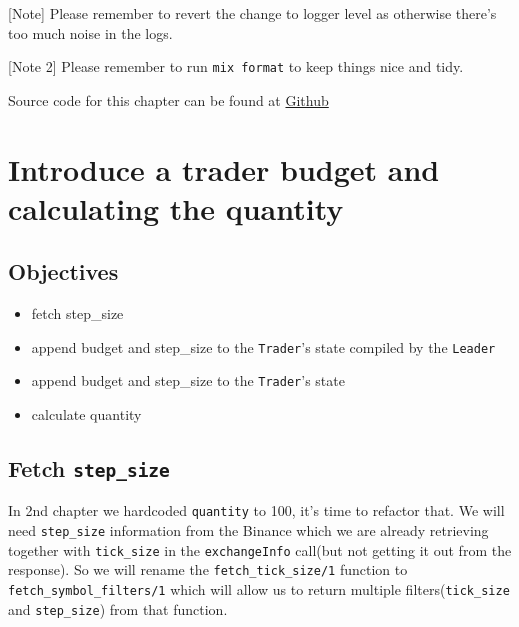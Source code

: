 \documentclass[
  oneside]{book}
\providecommand{\tightlist}{%
  \setlength{\itemsep}{0pt}\setlength{\parskip}{0pt}}
\begin{document}
{[}Note{]} Please remember to revert the change to logger level as otherwise there's too much noise in the logs.

{[}Note 2{]} Please remember to run \texttt{mix\ format} to keep things nice and tidy.

Source code for this chapter can be found at \href{https://github.com/frathon/create-a-cryptocurrency-trading-bot-in-elixir-source-code/tree/chapter_06}{Github}

\hypertarget{introduce-a-trader-budget-and-calculating-the-quantity}{%
\chapter{Introduce a trader budget and calculating the quantity}\label{introduce-a-trader-budget-and-calculating-the-quantity}}

\hypertarget{objectives-6}{%
\section{Objectives}\label{objectives-6}}

\begin{itemize}
\tightlist
\item
  fetch step\_size
\item
  append budget and step\_size to the \texttt{Trader}'s state compiled by the \texttt{Leader}
\item
  append budget and step\_size to the \texttt{Trader}'s state
\item
  calculate quantity
\end{itemize}

\hypertarget{fetch-step_size}{%
\section{\texorpdfstring{Fetch \texttt{step\_size}}{Fetch step\_size}}\label{fetch-step_size}}

In 2nd chapter we hardcoded \texttt{quantity} to 100, it's time to refactor that. We will need \texttt{step\_size} information from the Binance which we are
already retrieving together with \texttt{tick\_size} in the \texttt{exchangeInfo} call(but not getting it out from the response). So we will rename the \texttt{fetch\_tick\_size/1} function to \texttt{fetch\_symbol\_filters/1} which will allow us to return multiple filters(\texttt{tick\_size} and \texttt{step\_size}) from that function.
\end{document}
